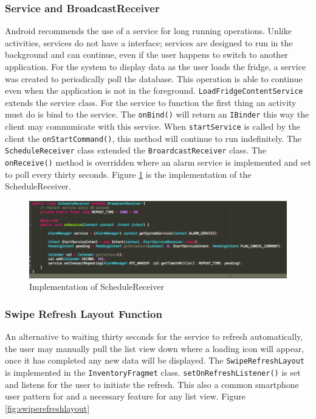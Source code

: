 \documentclass[a4paper, 11pt]{article}
\begin{document}
\subsubsection{Service and BroadcastReceiver}
Android recommends the use of a service for long running operations. Unlike activities, services do not have a interface; services are designed to run in the background and can continue, even if the user happens to switch to another application.
For the system to display data as the user loads the fridge, a service was created to periodically poll the database. This operation is able to continue even when the application is not in the foreground. \texttt{LoadFridgeContentService} extends the service class. For the service to function the first thing an activity must do is bind to the service. The \texttt{onBind()} will return an \texttt{IBinder} this way the client may communicate with this service. When \texttt{startService} is called by the client the \texttt{onStartCommand()}, this method will continue to run indefinitely. The \texttt{ScheduleReceiver} class extended the \texttt{BroardcastReceiver} class. The \texttt{onReceive()} method is overridden where an alarm service is implemented and set to poll every thirty seconds. Figure \ref{fig:service} is the implementation of the ScheduleReceiver.

\vspace{\baselineskip}

\begin{figure}[!htbp]
\centering
\includegraphics[width=\textwidth]{service}
\caption{Implementation of ScheduleReceiver} \label{fig:service}
\end{figure}

\subsubsection{Swipe Refresh Layout Function}
An alternative to waiting thirty seconds for the service to refresh automatically, the user may manually pull the list view down where a loading icon will appear, once it has completed any new data will be displayed. The \texttt{SwipeRefreshLayout} is implemented in the \texttt{InventoryFragmet} class. \texttt{setOnRefreshListener()} is set and listens for the user to initiate the refresh. This also a common smartphone user pattern for and a necessary feature for any list view. Figure \ref{fig:swiperefreshlayout}
\vspace{\baselineskip}
\end{document}
